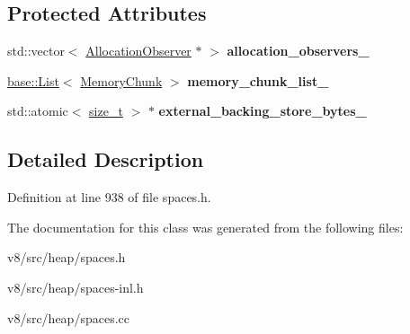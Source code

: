 \subsection*{Protected Attributes}
\begin{DoxyCompactItemize}
\item 
\mbox{\label{classv8_1_1internal_1_1Space_a9845a253be7bdd5f79f794f2165b7b5f}} 
std\+::vector$<$ \mbox{\hyperlink{classv8_1_1internal_1_1AllocationObserver}{Allocation\+Observer}} $\ast$ $>$ {\bfseries allocation\+\_\+observers\+\_\+}
\item 
\mbox{\label{classv8_1_1internal_1_1Space_af92d1e7de17ae749e985476c33f61397}} 
\mbox{\hyperlink{classv8_1_1base_1_1List}{base\+::\+List}}$<$ \mbox{\hyperlink{classv8_1_1internal_1_1MemoryChunk}{Memory\+Chunk}} $>$ {\bfseries memory\+\_\+chunk\+\_\+list\+\_\+}
\item 
\mbox{\label{classv8_1_1internal_1_1Space_a1dbf5d8f9218662108a65ca7395e4887}} 
std\+::atomic$<$ \mbox{\hyperlink{classsize__t}{size\+\_\+t}} $>$ $\ast$ {\bfseries external\+\_\+backing\+\_\+store\+\_\+bytes\+\_\+}
\end{DoxyCompactItemize}


\subsection{Detailed Description}


Definition at line 938 of file spaces.\+h.



The documentation for this class was generated from the following files\+:\begin{DoxyCompactItemize}
\item 
v8/src/heap/spaces.\+h\item 
v8/src/heap/spaces-\/inl.\+h\item 
v8/src/heap/spaces.\+cc\end{DoxyCompactItemize}
